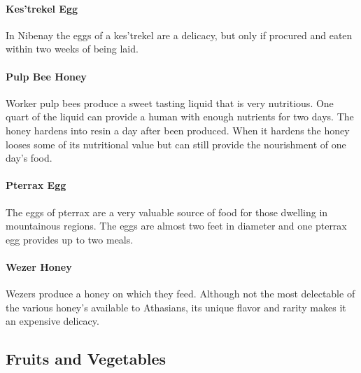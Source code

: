 \begin{multicols}{2}
\paragraph{Kes'trekel Egg} In Nibenay the eggs of a kes'trekel are a delicacy, but only if procured and eaten within two weeks of being laid.\\
\paragraph{Pulp Bee Honey} Worker pulp bees produce a sweet tasting liquid that is very nutritious. One quart of the liquid can provide a human with enough nutrients for two days. The honey hardens into resin a day after been produced. When it hardens the honey looses some of its nutritional value but can still provide the nourishment of one day's food.\\
\paragraph{Pterrax Egg} The eggs of pterrax are a very valuable source of food for those dwelling in mountainous regions. The eggs are almost two feet in diameter and one pterrax egg provides up to two meals.\\
\paragraph{Wezer Honey} Wezers produce a honey on which they feed. Although not the most delectable of the various honey's available to Athasians, its unique flavor and rarity makes it an expensive delicacy.\\

\end{multicols}
\hrulefill

\subsection{Fruits and Vegetables}


